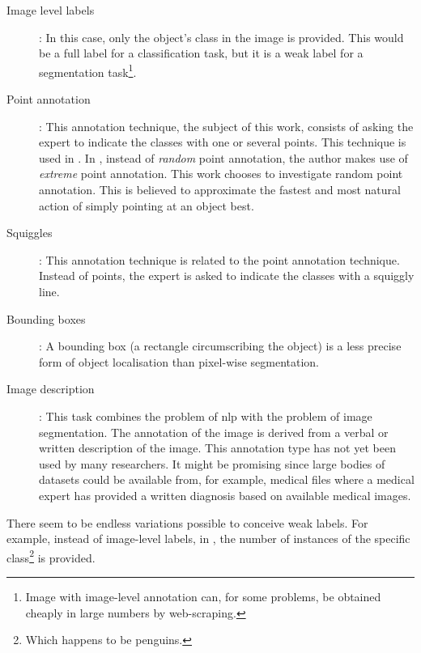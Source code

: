 \begin{description}
    \item[Image level labels]: In this case, only the object's class in the image is provided. 
    This would be a full label for a classification task, but it is a weak label for a segmentation task\footnote{
        Image with image-level annotation can, for some problems, be obtained cheaply in large numbers by web-scraping\cite{Shen}.}.
    \item[Point annotation]: This annotation technique, the subject of this work, consists of asking the expert to indicate the classes with one or several points. This technique is used in \cite{Laradji2020, Laradji2021, McEver2020}.
    In \cite{Maninis2018}, instead of \textit{random} point annotation, the author makes use of \textit{extreme} point annotation. 
    This work chooses to investigate random point annotation.
    This is believed to approximate the fastest and most natural action of simply pointing at an object best.
    \item[Squiggles]: This annotation technique is related to the point annotation technique. Instead of points, the expert is asked to indicate the classes with a squiggly line.
    \item[Bounding boxes]: A bounding box (a rectangle circumscribing the object) is a less precise form of object localisation than pixel-wise segmentation.
    \item[Image description]: This task combines the problem of \acrlong{nlp} with the problem of image segmentation. The annotation of the image is derived from a verbal or written description of the image. 
    This annotation type has not yet been used by many researchers. 
    It might be promising since large bodies of datasets could be available from, for example, medical files where a medical expert has provided a written diagnosis based on available medical images. 
\end{description}
\par{
    There seem to be endless variations possible to conceive weak labels. 
    For example, instead of image-level labels, in \cite{Laradji2018}, the number of instances of the specific class\footnote{Which happens to be penguins.} is provided. 
}
